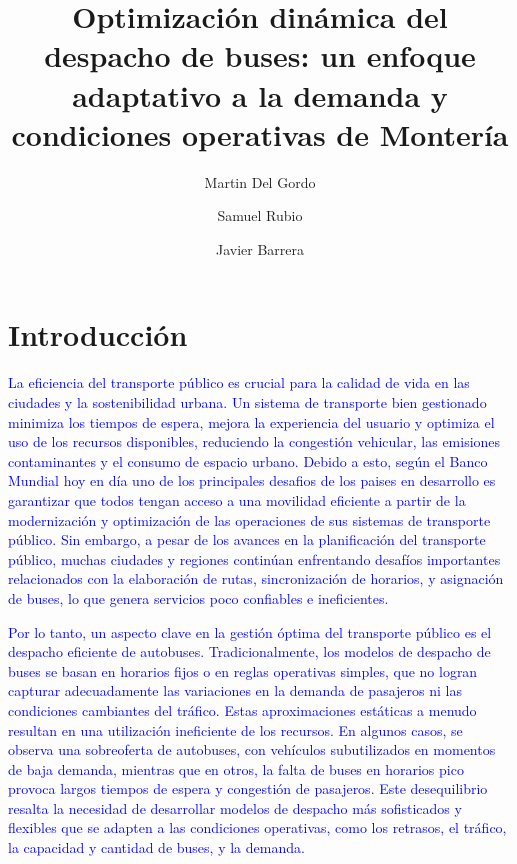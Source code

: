 \documentclass[preprint,11pt]{elsarticle}
\newcommand{\Blue}[1]{\textcolor{blue}{#1}}
\begin{document}
\begin{frontmatter}

\title{Optimización dinámica del despacho de buses: un enfoque adaptativo a la demanda y condiciones operativas de Montería}


\author[label1]{Martin Del Gordo}
\address[label1]{Departamento de Ingenier\'ia Industrial, Universidad de Los Andes, Colombia}

\author[label1]{Samuel Rubio}

\author[label1]{Javier Barrera}

\end{frontmatter}

\linenumbers
\section{Introducción}
\vspace{-1mm}
\label{Int}

\Blue{La eficiencia del transporte público es crucial para la calidad de vida en las ciudades y la sostenibilidad urbana. Un sistema de transporte bien gestionado minimiza los tiempos de espera, mejora la experiencia del usuario y optimiza el uso de los recursos disponibles, reduciendo la congestión vehicular, las emisiones contaminantes y el consumo de espacio urbano. Debido a esto, según el Banco Mundial\cite{worldbank_transport_2023} hoy en día uno de los principales desafios de los paises en desarrollo es garantizar que todos tengan acceso a una movilidad eficiente a partir de la modernización y optimización de las operaciones de sus sistemas de transporte público. Sin embargo, a pesar de los avances en la planificación del transporte público, muchas ciudades y regiones continúan enfrentando desafíos importantes relacionados con la elaboración de rutas, sincronización de horarios, y asignación de buses, lo que genera servicios poco confiables e ineficientes\cite{camos2020transporte}.}

\Blue{Por lo tanto, un aspecto clave en la gestión óptima del transporte público es el despacho eficiente de autobuses. Tradicionalmente, los modelos de despacho de buses se basan en horarios fijos o en reglas operativas simples, que no logran capturar adecuadamente las variaciones en la demanda de pasajeros ni las condiciones cambiantes del tráfico. Estas aproximaciones estáticas a menudo resultan en una utilización ineficiente de los recursos. En algunos casos, se observa una sobreoferta de autobuses, con vehículos subutilizados en momentos de baja demanda, mientras que en otros, la falta de buses en horarios pico provoca largos tiempos de espera y congestión de pasajeros.\cite{guihaire2008} Este desequilibrio resalta la necesidad de desarrollar modelos de despacho más sofisticados y flexibles que se adapten a las condiciones operativas, como los retrasos, el tráfico, la capacidad y cantidad de buses, y la demanda.}
\end{document}
